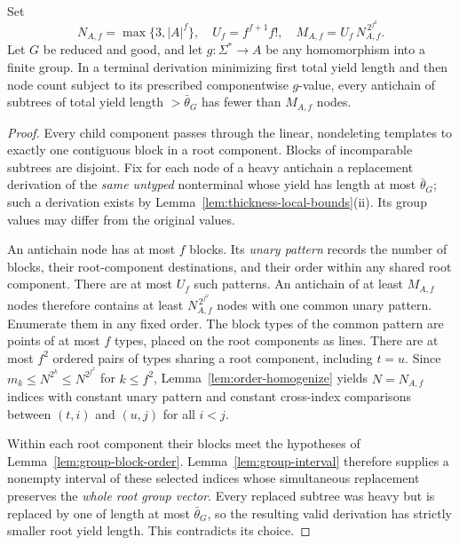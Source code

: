 \begin{lemma}
\label{lem:group-heavy-antichain}
Set
\[
 N_{A,f}=\max\{3,|A|^f\},\quad
 U_f=f^{f+1}f!,\quad
 M_{A,f}=U_f\,N_{A,f}^{\,2^{f^2}}.
\]
Let $G$ be reduced and good, and let $g:\Sigma^*\to A$
be any homomorphism into a finite group.  In a terminal
derivation minimizing first total yield length and then
node count subject to its prescribed componentwise
$g$-value, every antichain of subtrees of total yield
length $>\bar\theta_G$ has fewer than $M_{A,f}$ nodes.
\end{lemma}
\begin{proof}
Every child component passes through the linear,
nondeleting templates to exactly one contiguous block
in a root component.  Blocks of incomparable subtrees
are disjoint.  Fix for each node of a heavy antichain
a replacement derivation of the \emph{same untyped}
nonterminal whose yield has length at most
$\bar\theta_G$; such a derivation exists by
Lemma~\ref{lem:thickness-local-bounds}(ii).
Its group values may differ from the original values.

An antichain node has at most $f$ blocks.  Its
\emph{unary pattern} records the number of blocks,
their root-component destinations, and their order
within any shared root component.  There are at
most $U_f$ such patterns.  An antichain of at least
$M_{A,f}$ nodes therefore contains at least
$N_{A,f}^{\,2^{f^2}}$ nodes with one common unary
pattern.  Enumerate them in any fixed order.  The block
types of the common pattern are points of at most $f$
types, placed on the root components as lines.  There
are at most $f^2$ ordered pairs of types sharing a root
component, including $t=u$.  Since
$m_k\le N^{2^k}\le N^{2^{f^2}}$ for $k\le f^2$,
Lemma~\ref{lem:order-homogenize} yields $N=N_{A,f}$
indices with constant unary pattern and constant
cross-index comparisons between $(t,i)$ and $(u,j)$
for all $i<j$.

Within each root component their blocks meet
the hypotheses of
Lemma~\ref{lem:group-block-order}.
Lemma~\ref{lem:group-interval} therefore supplies
a nonempty interval of these selected indices
whose simultaneous replacement preserves the
\emph{whole root group vector}.  Every replaced
subtree was heavy but is replaced by one of length
at most $\bar\theta_G$, so the resulting valid
derivation has strictly smaller root yield length.
This contradicts its choice.
\end{proof}

